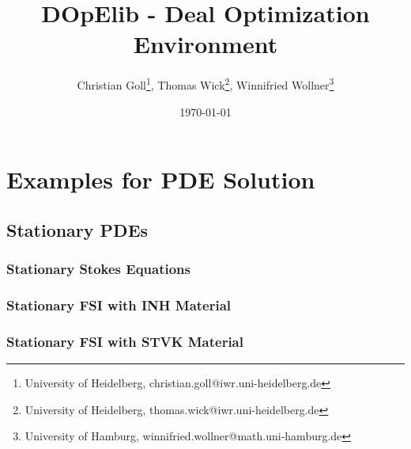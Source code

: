 \documentclass[a4paper,cleardoubleempty]{scrreprt}
\begin{document}
\title{DOpElib - Deal Optimization Environment}
\author{
  Christian Goll\thanks{University of Heidelberg, 
    {christian.goll@iwr.uni-heidelberg.de}}, 
  Thomas Wick\thanks{University of Heidelberg, 
    {thomas.wick@iwr.uni-heidelberg.de}}, 
  Winnifried Wollner\thanks{University of Hamburg, 
    {winnifried.wollner@math.uni-hamburg.de}}
}



\date{\today}

\maketitle
\cleardoublepage\pagestyle{headings}
\tableofcontents
\cleardoublepage







\chapter{Examples for PDE Solution}
\label{PDE}
\section{Stationary PDEs} 
\label{PDE_Stat}
\subsection{Stationary Stokes Equations} 
\label{PDE_Stat_Stokes}

\clearpage
\subsection{Stationary FSI with INH Material} 
\label{PDE_Stat_FSI_INH}

\clearpage
\subsection{Stationary FSI with STVK Material} 
\label{PDE_Stat_FSI_STVK}

\clearpage
\end{document}
